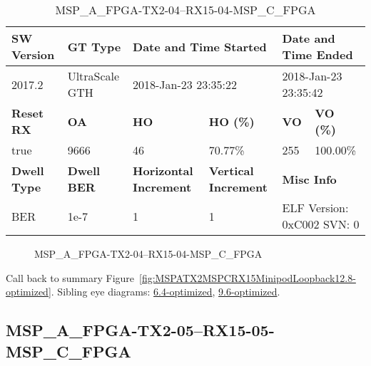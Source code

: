 \begin{table}[h]
\centering
\caption{MSP\_A\_FPGA-TX2-04--RX15-04-MSP\_C\_FPGA}
\label{tab:MSPAFPGATX204RX1504MSPCFPGA12.8-optimized}
\begin{tabular}{@{}|l|l|l|l|l|l|@{}}
\toprule
\textbf{SW Version}                & \textbf{GT Type}   & \multicolumn{2}{l|}{\textbf{Date and Time Started}}            & \multicolumn{2}{l|}{\textbf{Date and Time Ended}}        \\ \midrule
2017.2                       & UltraScale GTH          & \multicolumn{2}{l|}{2018-Jan-23 23:35:22}                   & \multicolumn{2}{l|}{2018-Jan-23 23:35:42}               \\ \midrule
\textbf{Reset RX}                  & \textbf{OA} & \textbf{HO}   & \textbf{HO (\%)} & \textbf{VO} & \textbf{VO (\%)} \\ \midrule
true & 9666        & 46          & 70.77\%        & 255        & 100.00\%       \\ \midrule
\textbf{Dwell Type}                & \textbf{Dwell BER} & \textbf{Horizontal Increment} & \textbf{Vertical Increment}    & \multicolumn{2}{l|}{\textbf{Misc Info}}                  \\ \midrule
BER                            & 1e-7        & 1        & 1           & \multicolumn{2}{l|}{ELF Version: 0xC002 SVN: 0}                         \\ \bottomrule
\end{tabular}
\end{table}

\begin{figure}[h]
\caption{MSP\_A\_FPGA-TX2-04--RX15-04-MSP\_C\_FPGA} \label{fig:MSPAFPGATX204RX1504MSPCFPGA12.8-optimized}
\end{figure}

Call back to summary Figure~\ref{fig:MSPATX2MSPCRX15MinipodLoopback12.8-optimized}.
Sibling eye diagrams: \hyperref[sec:MSPAFPGATX204RX1504MSPCFPGA6.4-optimized]{6.4-optimized}, \hyperref[sec:MSPAFPGATX204RX1504MSPCFPGA9.6-optimized]{9.6-optimized}.

\clearpage
\newpage


\subsection{MSP\_A\_FPGA-TX2-05--RX15-05-MSP\_C\_FPGA}\label{sec:MSPAFPGATX205RX1505MSPCFPGA12.8-optimized}

